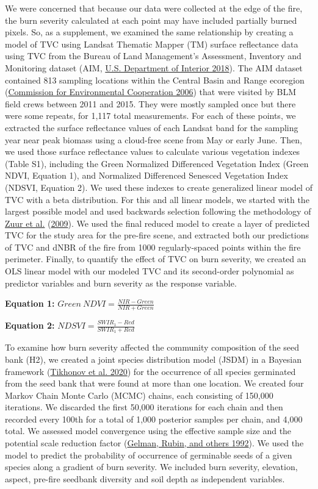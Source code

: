 \documentclass[
  12pt,
]{article}
\begin{document}
We were concerned that because our data were collected at the edge of
the fire, the burn severity calculated at each point may have included
partially burned pixels. So, as a supplement, we examined the same
relationship by creating a model of TVC using Landsat Thematic Mapper
(TM) surface reflectance data using TVC from the Bureau of Land
Management's Assessment, Inventory and Monitoring dataset (AIM,
\protect\hyperlink{ref-AIM}{U.S. Department of Interior 2018}). The AIM
dataset contained 813 sampling locations within the Central Basin and
Range ecoregion (\protect\hyperlink{ref-CEC2006}{Commission for
Environmental Cooperation 2006}) that were visited by BLM field crews
between 2011 and 2015. They were mostly sampled once but there were some
repeats, for 1,117 total measurements. For each of these points, we
extracted the surface reflectance values of each Landsat band for the
sampling year near peak biomass using a cloud-free scene from May or
early June. Then, we used those surface reflectance values to calculate
various vegetation indexes (Table S1), including the Green Normalized
Differenced Vegetation Index (Green NDVI, Equation 1), and Normalized
Differenced Senesced Vegetation Index (NDSVI, Equation 2). We used these
indexes to create generalized linear model of TVC with a beta
distribution. For this and all linear models, we started with the
largest possible model and used backwards selection following the
methodology of \protect\hyperlink{ref-Zuur2009}{Zuur et al.}
(\protect\hyperlink{ref-Zuur2009}{2009}). We used the final reduced
model to create a layer of predicted TVC for the study area for the
pre-fire scene, and extracted both our predictions of TVC and dNBR of
the fire from 1000 regularly-spaced points within the fire perimeter.
Finally, to quantify the effect of TVC on burn severity, we created an
OLS linear model with our modeled TVC and its second-order polynomial as
predictor variables and burn severity as the response variable.

\textbf{Equation 1:} \(Green~NDVI = \frac{NIR - Green}{NIR + Green}\)

\textbf{Equation 2:} \(NDSVI = \frac{SWIR_1 - Red}{SWIR_1 + Red}\)

To examine how burn severity affected the community composition of the
seed bank (H2), we created a joint species distribution model (JSDM) in
a Bayesian framework (\protect\hyperlink{ref-HMSC}{Tikhonov et al.
2020}) for the occurrence of all species germinated from the seed bank
that were found at more than one location. We created four Markov Chain
Monte Carlo (MCMC) chains, each consisting of 150,000 iterations. We
discarded the first 50,000 iterations for each chain and then recorded
every 100th for a total of 1,000 posterior samples per chain, and 4,000
total. We assessed model convergence using the effective sample size and
the potential scale reduction factor
(\protect\hyperlink{ref-Gelman1992}{Gelman, Rubin, and others 1992}). We
used the model to predict the probability of occurrence of germinable
seeds of a given species along a gradient of burn severity. We included
burn severity, elevation, aspect, pre-fire seedbank diversity and soil
depth as independent variables.
\end{document}
